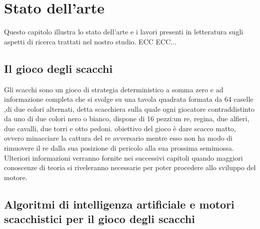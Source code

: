\chapter{Stato dell'arte} %
%

\begin{citazione}
Questo capitolo illustra lo stato dell'arte e i lavori presenti in letteratura sugli aspetti di ricerca trattati nel nostro studio. ECC ECC...
\end{citazione}

\newpage

\section{Il gioco degli scacchi} %
Gli scacchi sono un gioco di strategia deterministico a somma zero e ad informazione completa  
che si svolge su una tavola quadrata formata da 64 caselle ,di due colori alternati,
detta scacchiera sulla quale ogni giocatore contraddistinto da uno di due colori
nero o bianco, dispone di 16 pezzi:un re, regina, due alfieri, due cavalli, due torri e otto pedoni.
obiettivo del gioco è dare scacco matto, ovvero minacciare la cattura del re avversario mentre esso non
ha modo di rimuovere il re dalla sua posizione di pericolo alla sua prossima semimossa.
Ulteriori informazioni verranno fornite nei successivi capitoli quando maggiori conoscenze di teoria 
si riveleranno necessarie per poter procedere allo sviluppo del motore.
   







\section{Algoritmi di intelligenza artificiale e motori scacchistici  per il gioco degli scacchi}
